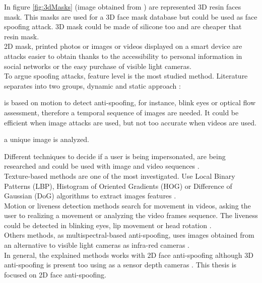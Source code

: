 In figure \ref{fig:3dMasks} (image obtained from \cite{3dmask}) are represented 3D resin faces mask. This masks are used for a 3D face mask database but could be used as face spoofing attack. 3D mask could be made of silicone too and are cheaper that resin mask.\\

2D mask, printed photos or images or videos displayed on a smart device are attacks easier to obtain thanks to the accessibility to personal information in social networks or the easy purchase of visible light cameras.\\

To argue spoofing attacks, feature level is the most studied method. Literature separates into two groups, dynamic and static approach \cite{Spoofing_survey}:
\begin{description}[noitemsep,topsep=8pt,parsep=0pt,partopsep=20pt]
\item[Dynamic:] is based on motion to detect anti-spoofing, for instance, blink eyes or optical flow assessment, therefore a temporal sequence of images are needed. It could be efficient when image attacks are used, but not too accurate when videos are used.
\item[Static:] a unique image is analyzed.
\end{description}

Different techniques to decide if a user is being impersonated, are being researched and could be used with image and video sequences \cite{Spoofing_survey}.\\

Texture-based methods are one of the most investigated. Use Local Binary Patterns (LBP),  Histogram of Oriented Gradients (HOG) or Difference of Gaussian (DoG) algorithms to extract images features \cite{distorsion,Spoofing_survey}.\\

Motion or liveness detection methods search for movement in videos, asking the user to realizing a movement or analyzing the video frames sequence. The liveness could be detected in blinking eyes, lip movement or head rotation \cite{distorsion,Spoofing_survey}.\\

Others methods, as multispectral-based anti-spoofing, uses images obtained from an alternative to visible light cameras as infra-red cameras \cite{distorsion}.\\

In general, the explained methods works with 2D face anti-spoofing although 3D anti-spoofing is present too using as a sensor depth cameras \cite{2d_3d_face}. This thesis is focused on 2D face anti-spoofing.\\
